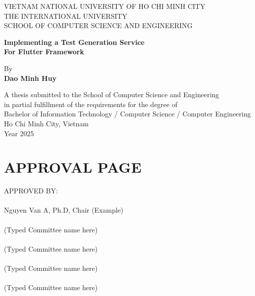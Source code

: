 \documentclass[12pt,a4paper]{report}
\begin{document}
\begin{titlepage}
    \centering
    \vspace*{2cm}
    {\LARGE VIETNAM NATIONAL UNIVERSITY OF HO CHI MINH CITY\\[0.2cm]
    THE INTERNATIONAL UNIVERSITY\\[0.2cm]
    SCHOOL OF COMPUTER SCIENCE AND ENGINEERING\\[2cm]}

    {\Huge\bfseries Implementing a Test Generation Service\\[0.3cm]
    For Flutter Framework\\[2cm]}

    {\Large By\\[0.2cm]
    \textbf{Dao Minh Huy}\\[2cm]}

    A thesis submitted to the School of Computer Science and Engineering\\
    in partial fulfillment of the requirements for the degree of \\
    Bachelor of Information Technology / Computer Science / Computer Engineering\\[4cm]

    {\large Ho Chi Minh City, Vietnam\\
    Year 2025}
\end{titlepage}

\chapter*{APPROVAL PAGE}
\noindent APPROVED BY:\\[1cm]
\underline{\hspace{10cm}} \\
Nguyen Van A, Ph.D, Chair (Example)\\[1cm]
\underline{\hspace{10cm}} \\
(Typed Committee name here)\\[1cm]
\underline{\hspace{10cm}} \\
(Typed Committee name here)\\[1cm]
\underline{\hspace{10cm}} \\
(Typed Committee name here)\\[1cm]
\underline{\hspace{10cm}} \\
(Typed Committee name here)
\end{document}
